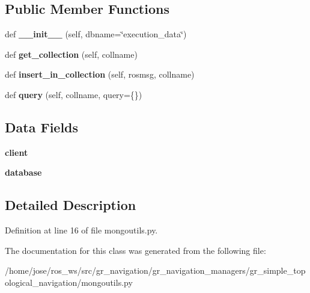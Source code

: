 \subsection*{Public Member Functions}
\begin{DoxyCompactItemize}
\item 
\mbox{\label{classmongoutils_1_1MongoManager_adf09c48a79fcc6fee14357fe0e4e7c48}} 
def {\bfseries \+\_\+\+\_\+init\+\_\+\+\_\+} (self, dbname=\char`\"{}execution\+\_\+data\char`\"{})
\item 
\mbox{\label{classmongoutils_1_1MongoManager_a14625279a8375d9faa968fb735fe75bd}} 
def {\bfseries get\+\_\+collection} (self, collname)
\item 
\mbox{\label{classmongoutils_1_1MongoManager_ad533c5aa2fe2178adeb7ae79c0b6f9ab}} 
def {\bfseries insert\+\_\+in\+\_\+collection} (self, rosmsg, collname)
\item 
\mbox{\label{classmongoutils_1_1MongoManager_ae6f80b3ab526c8d216eea64e3cb05de8}} 
def {\bfseries query} (self, collname, query=\{\})
\end{DoxyCompactItemize}
\subsection*{Data Fields}
\begin{DoxyCompactItemize}
\item 
\mbox{\label{classmongoutils_1_1MongoManager_ae256faf2012042129b91965ace9b36c6}} 
{\bfseries client}
\item 
\mbox{\label{classmongoutils_1_1MongoManager_a88927583f24004da9dab59d8e783df54}} 
{\bfseries database}
\end{DoxyCompactItemize}


\subsection{Detailed Description}


Definition at line 16 of file mongoutils.\+py.



The documentation for this class was generated from the following file\+:\begin{DoxyCompactItemize}
\item 
/home/jose/ros\+\_\+ws/src/gr\+\_\+navigation/gr\+\_\+navigation\+\_\+managers/gr\+\_\+simple\+\_\+topological\+\_\+navigation/mongoutils.\+py\end{DoxyCompactItemize}
